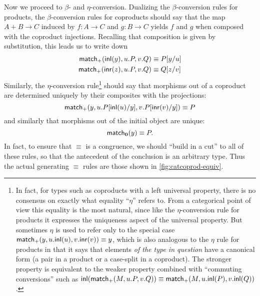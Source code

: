 Now we proceed to $\beta$- and $\eta$-conversion.
Dualizing the $\beta$-conversion rules for products, the $\beta$-conversion rules for coproducts should say that the map $A+B\to C$ induced by $f:A\to C$ and $g:B\to C$ yields $f$ and $g$ when composed with the coproduct injections.
Recalling that composition is given by substitution, this leads us to write down
\begin{align*}
  \mathsf{match}_+(\mathsf{inl}(y),u.P,v.Q) &\equiv P[y/u]\\
  \mathsf{match}_+(\mathsf{inr}(z),u.P,v.Q) &\equiv Q[z/v]
\end{align*}
Similarly, the $\eta$-conversion rule\footnote{In fact, for types such as coproducts with a left universal property, there is no consensus on exactly what equality ``$\eta$'' refers to.\label{fn:weak-eta}
  From a categorical point of view this equality is the most natural, since like the $\eta$-conversion rule for products it expresses the uniqueness aspect of the universal property.
  But sometimes $\eta$ is used to refer only to the special case $\mathsf{match}_+(y,u.\mathsf{inl}(u),v.\mathsf{inr}(v))\equiv y$, which is also analogous to the $\eta$ rule for products in that it says that elements \emph{of the type in question} have a canonical form (a pair in a product or a case-split in a coproduct).
  The stronger property is equivalent to the weaker property combined with ``commuting conversions'' such as $\mathsf{inl}(\mathsf{match}_+(M,u.P,v.Q)) \equiv \mathsf{match}_+(M,u.\mathsf{inl}(P),v.\mathsf{inl}(Q))$.%
} should say that morphisms out of a coproduct are determined uniquely by their composites with the projections:
\begin{equation}
  \case(y,u.P[\inl(u)/y],v.P[\inr(v)/y]) \equiv P\label{eq:catcoprod-eta}
\end{equation}
and similarly that morphisms out of the initial object are unique:
\[ \mathsf{match}_{\mathbf{0}}(y) \equiv P. \]
In fact, to ensure that $\equiv$ is a congruence, we should ``build in a cut'' to all of these rules, so that the antecedent of the conclusion is an arbitrary type.
Thus the actual generating $\equiv$ rules are those shown in \cref{fig:catcoprod-equiv}.
